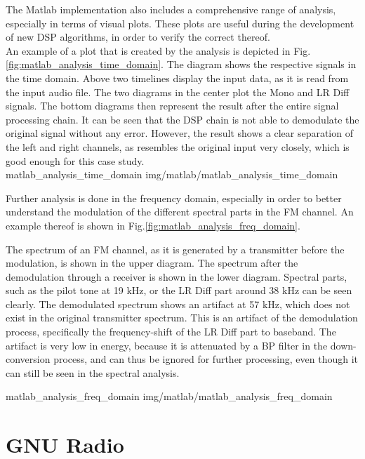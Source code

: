 The Matlab implementation also includes a comprehensive range of analysis, especially in terms of visual plots.
These plots are useful during the development of new DSP algorithms, in order to verify the correct thereof.\\

An example of a plot that is created by the analysis is depicted in Fig.\ref{fig:matlab_analysis_time_domain}.
The diagram shows the respective signals in the time domain.
Above two timelines display the input data, as it is read from the input audio file.
The two diagrams in the center plot the Mono and LR Diff signals.
The bottom diagrams then represent the result after the entire signal processing chain.
It can be seen that the DSP chain is not able to demodulate the original signal without any error.
However, the result shows a clear separation of the left and right channels, as resembles the original input very closely, which is good enough for this case study.\\

 {matlab_analysis_time_domain} {img/matlab/matlab_analysis_time_domain}

Further analysis is done in the frequency domain, especially in order to better understand the modulation of the different spectral parts in the FM channel.
An example thereof is shown in Fig.\ref{fig:matlab_analysis_freq_domain}.

The spectrum of an FM channel, as it is generated by a transmitter before the modulation, is shown in the upper diagram.
The spectrum after the demodulation through a receiver is shown in the lower diagram.
Spectral parts, such as the pilot tone at 19 kHz, or the LR Diff part around 38 kHz can be seen clearly.
The demodulated spectrum shows an artifact at 57 kHz, which does not exist in the original transmitter spectrum.
This is an artifact of the demodulation process, specifically the frequency-shift of the LR Diff part to baseband.
The artifact is very low in energy, because it is attenuated by a BP filter in the down-conversion process, and can thus be ignored for further processing, even though it can still be seen in the spectral analysis.

 {matlab_analysis_freq_domain} {img/matlab/matlab_analysis_freq_domain}

\section{GNU Radio}

